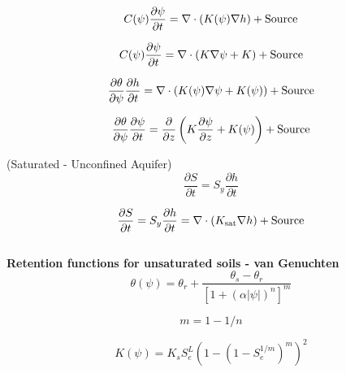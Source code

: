 \documentclass{article}
\begin{document}
\begin{equation}
     C(\psi)\frac{\partial \psi}{\partial t}  = \nabla \cdot \left( {K(\psi) \nabla h} \right) + {\rm Source}
\label{Richards_simple}
\end{equation}

\begin{equation}
     C(\psi)\frac{\partial \psi}{\partial t}  = \nabla \cdot \left( {K \nabla \psi} + K \right) + {\rm Source}
\label{Richards_simple}
\end{equation}

\begin{equation}
     \frac{\partial \theta}{\partial \psi}\frac{\partial h}{\partial t} = \nabla \cdot \left( {K(\psi) \nabla \psi} + K(\psi) \right) + {\rm Source}
\label{Richards_simple_uns}
\end{equation}

\begin{equation}
     \frac{\partial \theta}{\partial \psi}\frac{\partial \psi}{\partial t} = \frac{\partial}{\partial z}  \left( {K \frac{\partial \psi}{\partial z} + K(\psi)} \right) + {\rm Source}
\label{Richards_simple_uns_1D}
\end{equation}

(Saturated - Unconfined Aquifer)
\begin{equation}
     \frac{\partial S}{\partial t} = S_y \frac{\partial h}{\partial t}  
\end{equation}

\begin{equation}
     \frac{\partial S}{\partial t} = S_y \frac{\partial h}{\partial t} = \nabla \cdot \left( {K_{\rm sat} \nabla h} \right) + {\rm Source}
\label{Richards_simple}
\end{equation} \\


\textbf{Retention functions for unsaturated soils - van Genuchten} \\


\begin{equation}
     \theta(\psi) = \theta_r + \frac{\theta_s - \theta_r}{\left[ 1+(\alpha |\psi|)^n \right]^{m}}
\end{equation}

\begin{equation}
m=1-1/n
\end{equation}

\begin{equation}
     K(\psi) = K_{s} S_e^L \left (1 -  (1-S_e^{1/m})^m  \right)^2
\end{equation}
\end{document}
